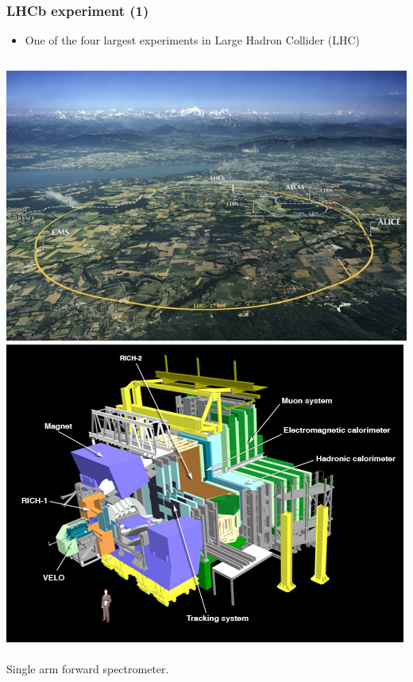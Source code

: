 \documentclass{beamer}
\begin{document}
\begin{frame}[t]
\frametitle{LHCb experiment (1)}
\begin{itemize}
  \item One of the four largest experiments in Large Hadron Collider (LHC)
\end{itemize}
\begin{columns}[t]
\includegraphics[width=\textwidth]{images/lhcb.png}
\includegraphics[width=\textwidth]{images/det.png}\\~\\
Single arm forward spectrometer.
\end{columns}

\end{frame}
\end{document}
